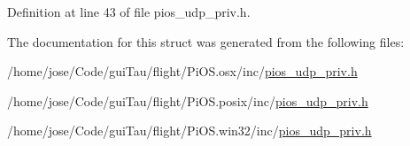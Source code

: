 Definition at line 43 of file pios\-\_\-udp\-\_\-priv.\-h.



The documentation for this struct was generated from the following files\-:\begin{DoxyCompactItemize}
\item 
/home/jose/\-Code/gui\-Tau/flight/\-Pi\-O\-S.\-osx/inc/\hyperlink{_pi_o_s_8osx_2inc_2pios__udp__priv_8h}{pios\-\_\-udp\-\_\-priv.\-h}\item 
/home/jose/\-Code/gui\-Tau/flight/\-Pi\-O\-S.\-posix/inc/\hyperlink{_pi_o_s_8posix_2inc_2pios__udp__priv_8h}{pios\-\_\-udp\-\_\-priv.\-h}\item 
/home/jose/\-Code/gui\-Tau/flight/\-Pi\-O\-S.\-win32/inc/\hyperlink{_pi_o_s_8win32_2inc_2pios__udp__priv_8h}{pios\-\_\-udp\-\_\-priv.\-h}\end{DoxyCompactItemize}
